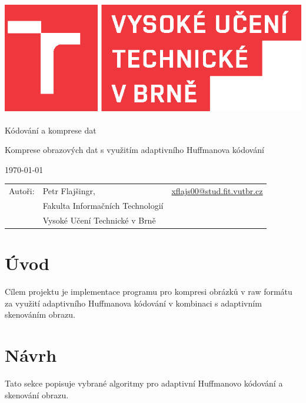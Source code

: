 \documentclass[12pt,a4paper,titlepage,final]{report}
\makeatletter
\newcommand\Course{Kódování a komprese dat}
\newcommand\WorkTitle{Komprese obrazových dat s využitím adaptivního Huffmanova kódování}
\newcommand\Author{Petr Flajšingr}
\newcommand\AuthorEmail{xflajs00@stud.fit.vutbr.cz}
\newcommand\Faculty{Fakulta Informačních Technologií}
\newcommand\School{Vysoké Učení Technické v Brně}
\makeatother
\begin{document}
	\begin{titlepage}
	\begin{center}
		\includegraphics[height=5cm]{images/logo.eps}
	\end{center}
	\vfill
	\begin{center}
		\begin{Large}
			\Course\\
		\end{Large}
		\bigskip
		\begin{Huge}
			\WorkTitle\\
		\end{Huge}
	\end{center}
	\vfill
	\begin{center}
		\begin{large}
			\today
		\end{large}
	\end{center}
	\vfill
	\begin{flushleft}
		\begin{large}
			\begin{tabular}{lll}
				Autoři: & \Author, & \url{\AuthorEmail} \\
				& \Faculty \\
				& \School \\
			\end{tabular}
		\end{large}
	\end{flushleft}
\end{titlepage}		

\section{Úvod}
Cílem projektu je implementace programu pro kompresi obrázků v raw formátu za využití adaptivního Huffmanova kódování v kombinaci s adaptivním skenováním obrazu.

\section{Návrh}
Tato sekce popisuje vybrané algoritmy pro adaptivní Huffmanovo kódování a skenování obrazu.
\end{document}
